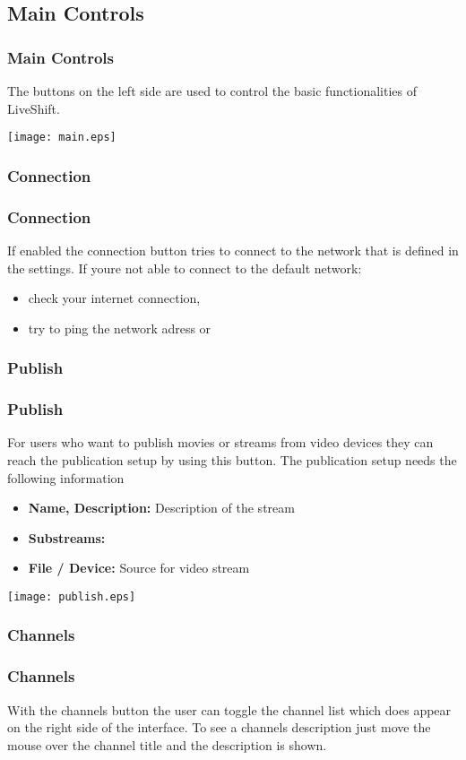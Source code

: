 \documentclass{beamer}
\begin{document}
\subsection{Main Controls}
\frame
{
\frametitle{Main Controls}
The buttons on the left side are used to control the basic functionalities of LiveShift.\linebreak
\begin{center}
\texttt{[image: main.eps]}
\end{center}
}

\subsubsection{Connection}
\frame
{
\frametitle{Connection}
If enabled the connection button tries to connect to the network that is defined in the settings.\linebreak
\linebreak
If youre not able to connect to the default network:
\begin{itemize}
\item check your internet connection,
\item try to ping the network adress or
\end{itemize}
}

\subsubsection{Publish}
\frame
{
\frametitle{Publish}
For users who want to publish movies or streams from video devices they can reach the publication setup by using this button.\linebreak
\linebreak
The publication setup needs the following information
\begin{itemize}
\item \textbf{Name, Description:} Description of the stream
\item \textbf{Substreams:} 
\item \textbf{File / Device:} Source for video stream 
\end{itemize}
\begin{center}
\texttt{[image: publish.eps]}
\end{center}
}

\subsubsection{Channels}
\frame
{
\frametitle{Channels}
With the channels button the user can toggle the channel list which does appear on the right side of the interface.\linebreak
To see a channels description just move the mouse over the channel title and the description is shown.\linebreak
}
\end{document}
